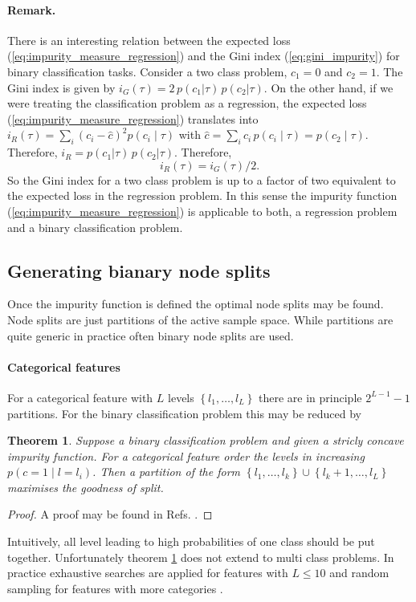 \documentclass[12pt,a4paper]{article}
\newtheorem{theorem}{Theorem}
\begin{document}
\paragraph{Remark.} There is an interesting relation between the expected loss (\ref{eq:impurity_measure_regression}) and the Gini index (\ref{eq:gini_impurity}) for binary classification tasks. Consider a two class problem, $c_1=0$ and $c_2=1$. The Gini index is given by $i_G(\tau) = 2\, p(c_1|\tau)\, p(c_2|\tau)$. On the other hand, if we were treating the classification problem as a regression, the expected loss (\ref{eq:impurity_measure_regression}) translates into $i_R(\tau) = \sum_i (c_i -\hat c)^2 p(c_i\mid \tau)$ with $\hat c = \sum_i c_i\,p(c_i \mid \tau) = p(c_2\mid \tau)$. Therefore, $i_R =  p(c_1|\tau)\, p(c_2|\tau)$. Therefore, 
$$i_R(\tau) = i_G(\tau) / 2.$$ So the Gini index for a two class problem is up to a factor of two equivalent to the expected loss in the regression problem.  In this sense the impurity function (\ref{eq:impurity_measure_regression}) is applicable to both, a regression problem and a binary classification problem. 

\subsection{Generating bianary node splits}
Once the impurity function is defined the optimal node splits may be found. Node splits are just partitions of the active sample space. While partitions are quite generic in practice often binary node splits are used. 

\paragraph{Categorical features}
For a categorical feature with $L$ levels $\left\{l_1, \dots, l_L\right\}$ there are in principle $2^{L-1} - 1$  partitions. For the  binary classification problem this may be reduced by
\begin{theorem}\label{thm:categorical_splits}
	Suppose a binary classification problem and given a stricly concave impurity function. For a categorical feature order the levels in increasing $p(c=1 \mid  l = l_i)$. Then a partition of the form $\left\{l_1, \dots, l_k\right\} \cup \left\{l_k+1, \dots, l_L\right\}$ maximises the goodness of split.
\end{theorem}
\begin{proof}
	A proof may be found in  Refs. \cite{Ripley1995, cart84}.
\end{proof}
Intuitively, all level leading to high probabilities of one class should be put together. 
Unfortunately theorem \ref{thm:categorical_splits} does not extend to multi class problems.
In practice exhaustive searches are applied for features with $L \leq 10$ and random sampling for features with more categories \cite{understanding_random_forests}.
\end{document}
